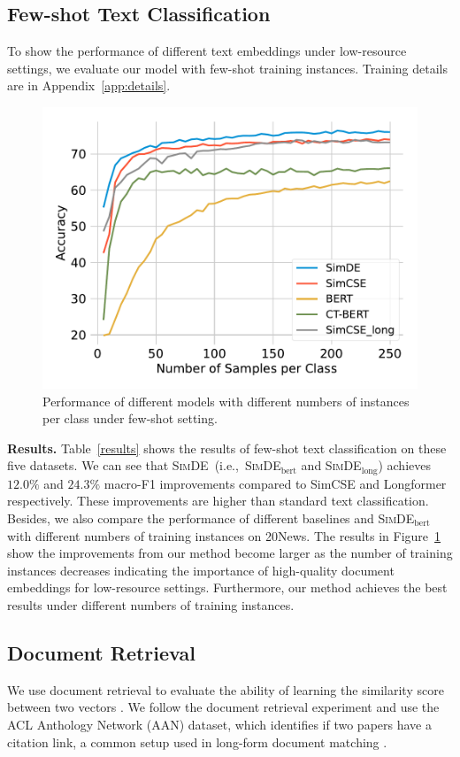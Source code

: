 \documentclass[11pt]{article}
\newcommand{\our}{\mbox{\textsc{SimDE}}}
\begin{document}
\subsection{Few-shot Text Classification}
To show the performance of different text embeddings under low-resource settings, we evaluate our model with few-shot training instances.
Training details are in Appendix~\ref{app:details}.

\begin{figure}
\centering
\includegraphics[width=0.8\linewidth]{fig/few_shot.pdf}
\caption{Performance of different models with different numbers of instances per class under few-shot setting.}
\label{few_shot}
\end{figure}

\textbf{Results.} 
Table~\ref{results} shows the results of few-shot text classification on these five datasets. 
We can see that \our~(i.e.,~\our$_{\mathrm{bert}}$ and \our$_{\mathrm{long}}$) achieves $12.0\%$ and $24.3\%$ macro-F1 improvements compared to SimCSE and Longformer respectively. These improvements are higher than standard text classification. 
Besides, we also compare the performance of different baselines and \our$_{\mathrm{bert}}$ with different numbers of training instances on 20News. 
The results in Figure~\ref{few_shot} show the improvements from our method become larger as the number of training instances decreases indicating the importance of high-quality document embeddings for low-resource settings. 
Furthermore, our method achieves the best results under different numbers of training instances.

\subsection{Document Retrieval}
We use document retrieval to evaluate the ability of learning the similarity score between two vectors \cite{ Guo2016ADR}. We follow the document retrieval experiment \cite{Tay2020LongRA} and use the ACL Anthology Network (AAN) \cite{Radev2009TheAA} dataset, which identifies if two papers have a citation link, a common setup used in long-form document matching \cite{Jiang2019SemanticTM,Yang2020Beyond5T}.
\end{document}
